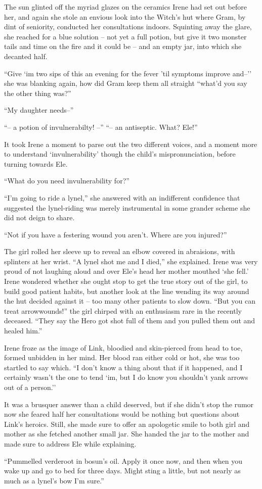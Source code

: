 \documentclass[../../FGP.tex]{subfiles}
\begin{document}
The sun glinted off the myriad glazes on the ceramics Irene had set out before her, and again she stole an envious look into the Witch's hut where Gram, by dint of seniority, conducted her consultations indoors. Squinting away the glare, she reached for a blue solution -- not yet a full potion, but give it two monster tails and time on the fire and it could be -- and an empty jar, into which she decanted half. 

``Give `im two sips of this an evening for the fever 'til symptoms improve and--'' she was blanking again, how did Gram keep them all straight ``what'd you say the other thing was?''

``My daughter needs--''

``-- a potion of invulnerabilty! --''
``-- an antiseptic. What? Ele!'' %

It took Irene a moment to parse out the two different voices, and a moment more to understand `invulnerability' though the child's mispronunciation, before turning towards Ele. 

``What do you need invulnerability for?''

``I'm going to ride a lynel,'' she answered with an indifferent confidence that suggested the lynel-riding was merely instrumental in some grander scheme she did not deign to share.

``Not if you have a festering wound you aren't. Where are you injured?''

The girl rolled her sleeve up to reveal an elbow covered in abraisions, with splinters at her wrist. ``A lynel shot me and I died,'' she explained. Irene was very proud of not laughing aloud and over Ele's head her mother mouthed `she fell.' Irene wondered whether she ought stop to get the true story out of the girl, to build good patient habits, but another look at the line wending its way around the hut decided against it -- too many other patients to slow down. ``But you can treat arrowwounds!'' the girl chirped with an enthusiasm rare in the recently deceased. ``They say the Hero got shot full of them and you pulled them out and healed him.'' 

Irene froze as the image of Link, bloodied and skin-pierced from head to toe, formed unbidden in her mind. Her blood ran either cold or hot, she was too startled to say which. ``I don't know a thing about that if it happened, and I certainly wasn't the one to tend `im, but I do know you shouldn't yank arrows out of a person.''

It was a brusquer answer than a child deserved, but if she didn't stop the rumor now she feared half her consultations would be nothing but questions about Link's heroics. Still, she made sure to offer an apologetic smile to both girl and mother as she fetched another small jar. She handed the jar to the mother and made sure to address Ele while explaining. 

``Pummelled verderoot in bosun's oil. Apply it once now, and then when you wake up and go to bed for three days. Might sting a little, but not nearly as much as a lynel's bow I'm sure.'' 
\end{document}
